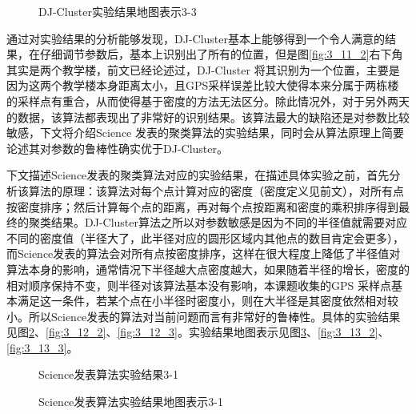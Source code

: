 \begin{figure}[htb]
  \centering%
  \hspace{4em}%
  \caption{DJ-Cluster实验结果地图表示3-3}
  \label{fig:3_11_3}
\end{figure}
\par 通过对实验结果的分析能够发现，DJ-Cluster基本上能够得到一个令人满意的结果，在仔细调节参数后，基本上识别出了所有的位置，但是图\ref{fig:3_11_2}右下角其实是两个教学楼，前文已经论述过，DJ-Cluster 将其识别为一个位置，主要是因为这两个教学楼本身距离太小，且GPS采样误差比较大使得本来分属于两栋楼的采样点有重合，从而使得基于密度的方法无法区分。除此情况外，对于另外两天的数据，该算法都表现出了非常好的识别结果。该算法最大的缺陷还是对参数比较敏感，下文将介绍Science 发表的聚类算法的实验结果，同时会从算法原理上简要论述其对参数的鲁棒性确实优于DJ-Cluster。
\par 下文描述Science发表的聚类算法对应的实验结果，在描述具体实验之前，首先分析该算法的原理：该算法对每个点计算对应的密度（密度定义见前文），对所有点按密度排序；然后计算每个点的距离，再对每个点按距离和密度的乘积排序得到最终的聚类结果。DJ-Cluster算法之所以对参数敏感是因为不同的半径值就需要对应不同的密度值（半径大了，此半径对应的圆形区域内其他点的数目肯定会更多），而Science发表的算法会对所有点按密度排序，这样在很大程度上降低了半径值对算法本身的影响，通常情况下半径越大点密度越大，如果随着半径的增长，密度的相对顺序保持不变，则半径对该算法基本没有影响，本课题收集的GPS 采样点基本满足这一条件，若某个点在小半径时密度小，则在大半径是其密度依然相对较小。所以Science发表的算法对当前问题而言有非常好的鲁棒性。具体的实验结果见图\ref{fig:3_12_1}、\ref{fig:3_12_2}、\ref{fig:3_12_3}。实验结果地图表示见图\ref{fig:3_13_1}、\ref{fig:3_13_2}、\ref{fig:3_13_3}。
\begin{figure}[htb]
  \centering%
  \hspace{4em}%
  \caption{Science发表算法实验结果3-1}
  \label{fig:3_12_1}
\end{figure}
\begin{figure}[htb]
  \centering%
  \hspace{4em}%
  \caption{Science发表算法实验结果地图表示3-1}
  \label{fig:3_13_1}
\end{figure}
